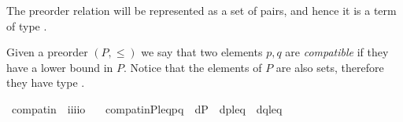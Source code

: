 The preorder relation will be represented as a set of pairs, and hence
it is a term of type
.
\begin{definition}
  Given a preorder $(P,\leqslant)$ we say that two elements $p,q$ are
  \emph{compatible} if they have a lower bound in $P$. Notice that
  the elements of $P$ are also sets, therefore they have type
  .
  \begin{isabelle}%
  \isamarkupfalse%
\ compat{\isacharunderscore}in\ {\isacharcolon}{\isacharcolon}\ {\isachardoublequoteopen}i{\isasymRightarrow}i{\isasymRightarrow}i{\isasymRightarrow}i{\isasymRightarrow}o{\isachardoublequoteclose}\ \isanewline
\ \ {\isachardoublequoteopen}compat{\isacharunderscore}in{\isacharparenleft}P{\isacharcomma}leq{\isacharcomma}p{\isacharcomma}q{\isacharparenright}\ {\isacharequal}{\isacharequal}\ {\isasymexists}d{\isasymin}P\ {\isachardot}\ {\isasymlangle}d{\isacharcomma}p{\isasymrangle}{\isasymin}leq\ {\isasymand}\ {\isasymlangle}d{\isacharcomma}q{\isasymrangle}{\isasymin}leq{\isachardoublequoteclose}
\end{isabelle}
\end{definition}

